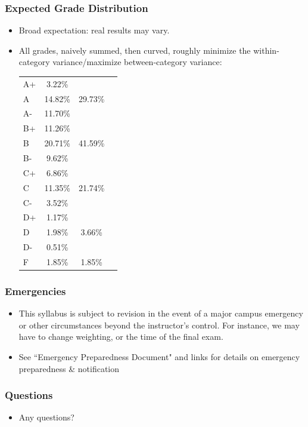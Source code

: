 \documentclass{beamer}
\begin{document}
\begin{frame}
\frametitle[alignment=center]{Expected Grade Distribution}
\begin{itemize}
\item Broad expectation: real results may vary.
\bigskip
\item All grades, naively summed, then curved, roughly minimize the within-category variance/maximize between-category variance:
\begin{table}
\begin{tabular}{lccc}
A+ & 3.22\% & \\
A & 14.82\% & 29.73\%\\
A- & 11.70\% & \\
B+ & 11.26\% & \\
B & 20.71\% & 41.59\%\\
B- & 9.62\% & \\
C+ & 6.86\% & \\
C & 11.35\% & 21.74\%\\
C- & 3.52\% & \\
D+ & 1.17\% & \\
D & 1.98\% & 3.66\%\\
D- & 0.51\% & \\
F & 1.85\% & 1.85\%\\
\end{tabular}
\end{table}
\end{itemize}
\end{frame}

\begin{frame}
\frametitle[alignment=center]{Emergencies}
\begin{itemize}
\item This syllabus is subject to revision in the event of a major campus emergency or other circumstances beyond the instructor's control.  For instance, we may have to change weighting, or the time of the final exam.
\bigskip
\item See ``Emergency Preparedness Document" and links for details on emergency preparedness \& notification
\end{itemize}
\end{frame}

\begin{frame}
\frametitle[alignment=center]{Questions}
\begin{itemize}
\item Any questions?
\end{itemize}
\end{frame}
\end{document}
